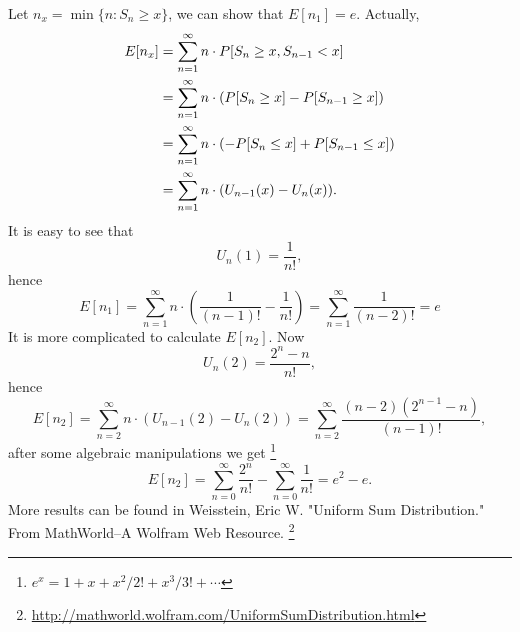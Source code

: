 \begin{example}
Let $n_x=\min\{n:S_n\ge x\}$, we can show that $E[n_1]=e$. Actually,
\begin{align*}
	E[n_x] &= \sum_{n=1}^{\infty} n \cdot P[S_n\ge x, S_{n-1}<x]  \notag \\
		&= \sum_{n=1}^{\infty} n \cdot (P[S_n\ge x] - P[S_{n-1}\ge x])  \notag \\
		&= \sum_{n=1}^{\infty} n \cdot (-P[S_n\le x] + P[S_{n-1}\le x])  \notag \\
	  &= \sum_{n=1}^{\infty} n \cdot (U_{n-1}(x) - U_n(x)).  \notag 
\end{align*}
It is easy to see that 
\[
	U_n(1) = \frac{1}{n!},
\]
hence
\[
	E[n_1] = \sum_{n=1}^{\infty} n\cdot (\frac{1}{(n-1)!}-\frac{1}{n!})
       	= \sum_{n=1}^{\infty} \frac{1}{(n-2)!} = e
\]
It is more complicated to calculate $E[n_2]$. Now
\[
	U_n(2)= \frac{2^n-n}{n!},
\]
hence
\[
	E[n_2] = \sum_{n=2}^{\infty} n\cdot (U_{n-1}(2) - U_n(2))
	  = \sum_{n=2}^{\infty} \frac{(n-2)(2^{n-1}-n)}{(n-1)!},
\]
after some algebraic manipulations we get
\footnote{$e^x=1+x+x^2/2!+x^3/3!+\cdots$}
\[
	E[n_2]=\sum_{n=0}^{\infty} \frac{2^n}{n!} - \sum_{n=0}^{\infty} \frac{1}{n!}
	      = e^2 - e.
\]
More results can be found in Weisstein, Eric W. "Uniform Sum Distribution." 
From MathWorld--A Wolfram Web Resource. 
\footnote{\url{http://mathworld.wolfram.com/UniformSumDistribution.html}}
\end{example}
